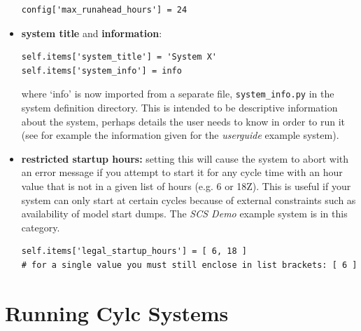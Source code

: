 \documentclass[11pt,a4paper]{article}
\begin{document}
\begin{itemize}
        \begin{lstlisting}
config['max_runahead_hours'] = 24
        \end{lstlisting}


    \item {\bf system title} and {\bf information}: 

        \begin{lstlisting}
self.items['system_title'] = 'System X'
self.items['system_info'] = info
        \end{lstlisting}
        where `info' is now imported from a separate file, 
        \lstinline=system_info.py= in the system definition directory.
        This is intended to be descriptive information about the system,
        perhaps details the user needs to know in order to run it (see
        for example the information given for the {\em userguide}
        example system).

    \item {\bf restricted startup hours:} setting this will cause 
        the system to abort with an error message if you attempt to
        start it for any cycle time with an hour value that is not in a given
        list of hours (e.g. 6 or 18Z). This is useful if your system 
        can only start at certain cycles because of external constraints
        such as availability of model start dumps. The {\em SCS Demo}
        example system is in this category.

    \begin{lstlisting}
self.items['legal_startup_hours'] = [ 6, 18 ]
# for a single value you must still enclose in list brackets: [ 6 ] 
    \end{lstlisting}

\end{itemize}


\pagebreak

%
%
%

\lstset{language=}


\pagebreak
\section{Running Cylc Systems}
\label{RunningCylcSystems}
\end{document}
